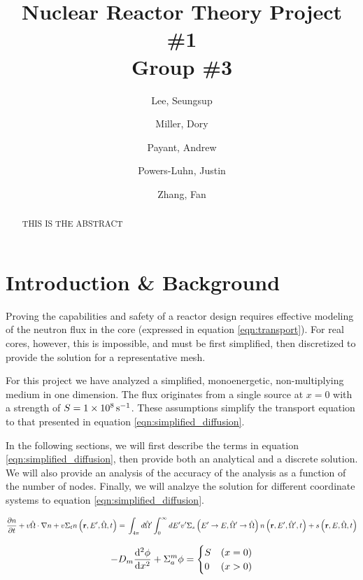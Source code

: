 \documentclass[10pt,peerreviewca,onecolumn]{IEEEtran} %
\author{
	Lee, Seungsup
	\and
	Miller, Dory
	\and
	Payant, Andrew
	\and
	Powers-Luhn, Justin
	\and
	Zhang, Fan
}
\title{Nuclear Reactor Theory Project \#1\\Group \#3}
\begin{document}
	\maketitle
	\newpage

	\begin{abstract}
		THIS IS THE ABSTRACT
	\end{abstract}
	
	\section{Introduction \& Background}
	Proving the capabilities and safety of a reactor design requires effective modeling of the neutron flux in the core (expressed in equation \ref{eqn:transport}). For real cores, however, this is impossible, and must be first simplified, then discretized to provide the solution for a representative mesh. 

	For this project we have analyzed a simplified, monoenergetic, non-multiplying medium in one dimension. The flux originates from a single source at $x=0$ with a strength of $S=\SI{1E8}{\per\second}$. These assumptions simplify the transport equation to that presented in equation \ref{eqn:simplified_diffusion}.

	In the following sections, we will first describe the terms in equation \ref{eqn:simplified_diffusion}, then provide both an analytical and a discrete solution. We will also provide an analysis of the accuracy of the analysis as a function of the number of nodes. Finally, we will analzye the solution for different coordinate systems to equation \ref{eqn:simplified_diffusion}.

	\begin{equation}
		\pdv{n}{t} + v \hat{\Omega} \cdot \nabla n + v \Sigma_t n \left( \mathbf{r}, E^\prime, \hat{\Omega}, t \right) = \\ \int_{4\pi} d \hat{\Omega} ^\prime \int_0^{\infty} dE ^\prime v^\prime \Sigma_s\left( E ^\prime \rightarrow E, \hat{\Omega} ^\prime \rightarrow \hat{\Omega} \right) n\left( \mathbf{r}, E ^\prime, \hat{\Omega} ^\prime, t \right) + s\left( \mathbf{r}, E, \hat{\Omega}, t \right)
		\label{eqn:transport}
	\end{equation}

	\begin{equation}
		-D_m \dv[2]{\phi}{x} + \Sigma^m_a \phi = 
		\begin{cases}
			S & \left(x=0\right) \\
			0 & \left(x>0\right)
		\end{cases}
		\label{eqn:simplified_diffusion}
	\end{equation}
\end{document}
